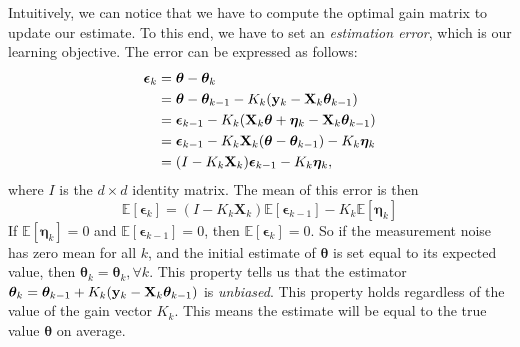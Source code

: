 Intuitively, we can notice that we have to compute the optimal gain matrix to update our estimate. To this end, we have to set an \textit{estimation error}, which is our learning objective. The error can be expressed as follows: 
\begin{align*}
	\boldsymbol{\epsilon}_k	&= \boldsymbol{\theta}-\boldsymbol{\theta}_k \\
							&= \boldsymbol{\theta}-\boldsymbol{\theta}_{k-1} - K_k ({\mathbf{y}}_k-\mathbf{X}_k\boldsymbol{\theta}_{k-1})\\
							&= \boldsymbol{\epsilon}_{k-1}-K_k (\mathbf{X}_k\boldsymbol{\theta}+\boldsymbol{\eta}_k-\mathbf{X}_k\boldsymbol{\theta}_{k-1})\\
							&= \boldsymbol{\epsilon}_{k-1}-K_k \mathbf{X}_k(\boldsymbol{\theta}-\boldsymbol{\theta}_{k-1})-K_k\boldsymbol{\eta}_k\\
							&= (I-K_k \mathbf{X}_k)\boldsymbol{\epsilon}_{k-1}-K_k\boldsymbol{\eta}_k,
\end{align*}
where $I$ is the $d\times d$ identity matrix. The mean of this error is then
$$\mathbb{E}[\boldsymbol{\epsilon}_{k}] = (I-K_k \mathbf{X}_k)\mathbb{E}[\boldsymbol{\epsilon}_{k-1}]-K_k\mathbb{E}[\boldsymbol{\eta}_{k}]$$
If $\mathbb{E}[\boldsymbol{\eta}_{k}]=0$ and $\mathbb{E}[\boldsymbol{\epsilon}_{k-1}]=0$, then $\mathbb{E}[\boldsymbol{\epsilon}_{k}]=0$. So if the measurement noise has zero mean for all $k$, and the initial estimate of $\boldsymbol{\theta}$ is set equal to its expected value, then $\boldsymbol{\theta}_k=\boldsymbol{\theta}_k, \forall k$. This property tells us that the estimator $\boldsymbol{\theta}_k = \boldsymbol{\theta}_{k-1}+K_k ({\mathbf{y}}_k-\mathbf{X}_k\boldsymbol{\theta}_{k-1})$ is \textit{unbiased}. This property holds regardless of the value of the gain vector $K_k$. This means the estimate will be equal to the true value $\boldsymbol{\theta}$ on average. 

